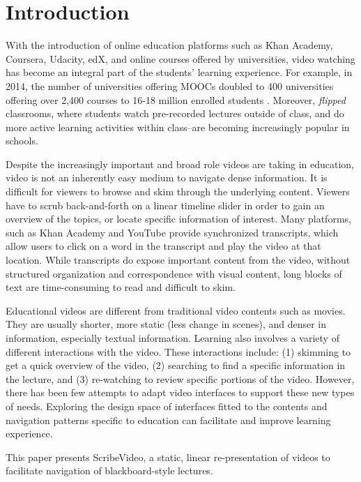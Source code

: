 \section{Introduction}
With the introduction of online education platforms such as Khan Academy, Coursera, Udacity, edX, and online courses offered by universities, video watching has become an integral part of the students' learning experience. For example, in 2014, the number of universities offering MOOCs doubled to 400 universities offering over 2,400 courses to 16-18 million enrolled students \cite{edsurge2014}. Moreover, \textit{flipped} classrooms, where students watch pre-recorded lectures outside of class, and do more active learning activities within class--are becoming increasingly popular in schools.  

Despite the increasingly important and broad role videos are taking in education, video is not an inherently easy medium to navigate dense information. It is difficult for viewers to browse and skim through the underlying content. Viewers have to scrub back-and-forth on a linear timeline slider in order to gain an overview of the topics, or locate specific information of interest. Many platforms, such as Khan Academy and YouTube provide synchronized transcripts, which allow users to click on a word in the transcript and play the video at that location. While transcripts do expose important content from the video, without structured organization and correspondence with visual content, long blocks of text are time-consuming to read and difficult to skim. 

Educational videos are different from traditional video contents such as movies. They are usually shorter, more static (less change in scenes), and denser in information, especially textual information. Learning also involves a variety of different interactions with the video. These interactions include: (1) skimming to get a quick overview of the video, (2) searching to find a specific information in the lecture, and (3) re-watching to review specific portions of the video. However, there has been few attempts to adapt video interfaces to support these new types of needs. Exploring the design space of interfaces fitted to the contents and navigation patterns specific to education can facilitate and improve learning experience.

This paper presents ScribeVideo, a static, linear re-presentation of videos to facilitate navigation of blackboard-style lectures. 

